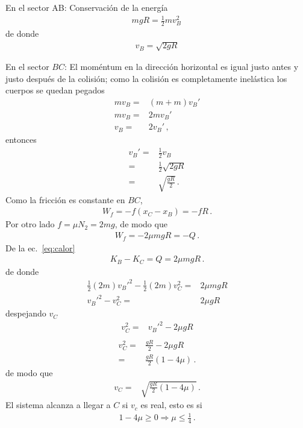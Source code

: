 En el sector AB: Conservación de la energía
\begin{align}
  mgR=\tfrac{1}{2}m v^2_B\,
\end{align}
de donde
\begin{align}
  v_B=\sqrt{2gR}
\end{align}

En el sector $BC$: El moméntum en la dirección horizontal es igual justo
antes y justo después de la colisión; como la colisión es
completamente inelástica los cuerpos se quedan pegados
\begin{align}
  m v_B=&(m+m) v_B'\nonumber\\
  m v_B=&2m v_B'\nonumber\\
   v_B=&2v_B'\,,
\end{align}
entonces
\begin{align}
  v_B'=&\tfrac{1}{2}v_B\nonumber\\
  =&\tfrac{1}{2}\sqrt{2gR}\nonumber\\
  =&\sqrt{\frac{gR}{2}}\,.
\end{align}
Como la fricción es constante en $BC$,
\begin{align}
  W_f=-f(x_C-x_B)=-f R\,.
\end{align}
Por otro lado $f=\mu N_2=2 m g$, de modo que
\begin{align}
  W_f=-2 \mu m g R=-Q\,.
\end{align}
De la ec.~\eqref{eq:calor}
\begin{align}
  K_B-K_C=Q=2\mu m g R\,.
\end{align}
de donde
\begin{align}
  \tfrac{1}{2}(2m){v_B'}^2-  \tfrac{1}{2}(2m)v_C^2=&2\mu m g R\nonumber\\
  {v_B'}^2- v_C^2=&2\mu  g R
\end{align}
despejando $v_C$
\begin{align}
   v_C^2=&{v_B'}^2-2\mu g R\nonumber\\
\end{align}
\begin{align}
  v_C^2=&\frac{gR}{2}-2\mu g R\nonumber\\
  =&\frac{gR}{2}\left(1-4\mu \right)\,.
\end{align}
de modo que
\begin{align}
  v_C=&\sqrt{\frac{gR}{2}\left(1-4\mu \right)}\,.
\end{align}
El sistema alcanza a llegar a $C$ si $v_c$ es real, esto es si
\begin{align}
  1-4\mu\ge 0\Longrightarrow \mu\le \frac{1}{4}\,.
\end{align}

